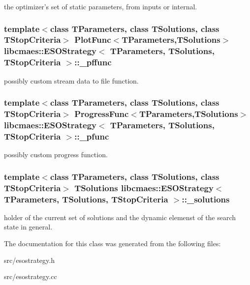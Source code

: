 the optimizer's set of static parameters, from inputs or internal. \hypertarget{classlibcmaes_1_1ESOStrategy_af2c9909de76f98e4b9c207bda577255d}{
\subsubsection[{\+\_\+pffunc}]{\setlength{\rightskip}{0pt plus 5cm}template$<$class T\+Parameters, class T\+Solutions, class T\+Stop\+Criteria$>$ Plot\+Func$<$T\+Parameters,T\+Solutions$>$ {\bf libcmaes\+::\+E\+S\+O\+Strategy}$<$ T\+Parameters, T\+Solutions, T\+Stop\+Criteria $>$\+::\+\_\+pffunc\hspace{0.3cm}{\ttfamily [protected]}}}\label{classlibcmaes_1_1ESOStrategy_af2c9909de76f98e4b9c207bda577255d}
possibly custom stream data to file function. \hypertarget{classlibcmaes_1_1ESOStrategy_a25d597189596f434a2530887fddea189}{
\subsubsection[{\+\_\+pfunc}]{\setlength{\rightskip}{0pt plus 5cm}template$<$class T\+Parameters, class T\+Solutions, class T\+Stop\+Criteria$>$ Progress\+Func$<$T\+Parameters,T\+Solutions$>$ {\bf libcmaes\+::\+E\+S\+O\+Strategy}$<$ T\+Parameters, T\+Solutions, T\+Stop\+Criteria $>$\+::\+\_\+pfunc\hspace{0.3cm}{\ttfamily [protected]}}}\label{classlibcmaes_1_1ESOStrategy_a25d597189596f434a2530887fddea189}
possibly custom progress function. \hypertarget{classlibcmaes_1_1ESOStrategy_a8fe0f8dc2201951e9e4ed2768b5a09ab}{
\subsubsection[{\+\_\+solutions}]{\setlength{\rightskip}{0pt plus 5cm}template$<$class T\+Parameters, class T\+Solutions, class T\+Stop\+Criteria$>$ T\+Solutions {\bf libcmaes\+::\+E\+S\+O\+Strategy}$<$ T\+Parameters, T\+Solutions, T\+Stop\+Criteria $>$\+::\+\_\+solutions\hspace{0.3cm}{\ttfamily [protected]}}}\label{classlibcmaes_1_1ESOStrategy_a8fe0f8dc2201951e9e4ed2768b5a09ab}
holder of the current set of solutions and the dynamic elemenst of the search state in general. 

The documentation for this class was generated from the following files\+:\begin{DoxyCompactItemize}
\item 
src/esostrategy.\+h\item 
src/esostrategy.\+cc\end{DoxyCompactItemize}
